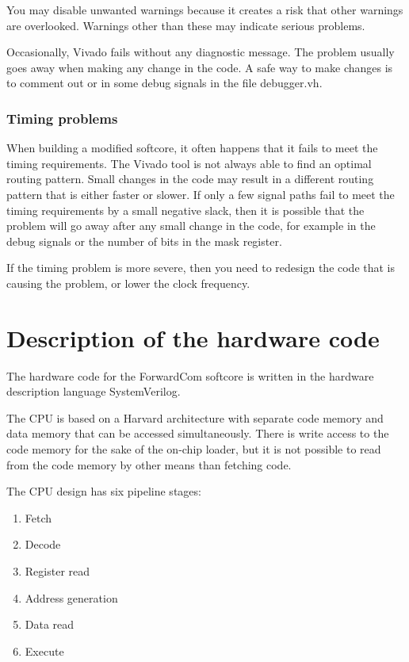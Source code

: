 \documentclass[11pt,a4paper,oneside,openright]{report}
\newcommand{\vv}{ \vspace{2mm} }   %
\begin{document}
You may disable unwanted warnings because it creates a risk that other warnings are overlooked. Warnings other than these may indicate serious problems.
\vv

Occasionally, Vivado fails without any diagnostic message. The problem usually goes away when making any change in the code. A safe way to make changes is to comment out or in some debug signals in the file debugger.vh.
\vv


\subsubsection{Timing problems}
When building a modified softcore, it often happens that it fails to meet the timing requirements. The Vivado tool is not always able to find an optimal routing pattern. Small changes in the code may result in a different routing pattern that is either faster or slower. If only a few signal paths fail to meet the timing requirements by a small negative slack, then it is possible that the problem will go away after any small change in the code, for example in the debug signals or the number of bits in the mask register.
\vv

If the timing problem is more severe, then you need to redesign the code that is causing the problem, or lower the clock frequency.
\vv

\section{Description of the hardware code} \label{Chap:DescriptionHWCode}
The hardware code for the ForwardCom softcore is written in the hardware description language SystemVerilog. 
\vv

The CPU is based on a Harvard architecture with separate code memory and data memory that can be accessed simultaneously. There is write access to the code memory for the sake of the on-chip loader, but it is not possible to read from the code memory by other means than fetching code.
\vv

The CPU design has six pipeline stages:
\vv

\begin{enumerate}
\item Fetch
\item Decode
\item Register read
\item Address generation
\item Data read
\item Execute
\end{enumerate}
\vv
\end{document}

